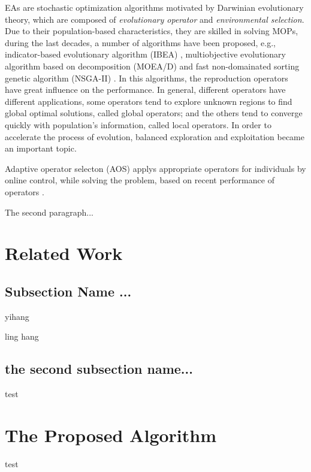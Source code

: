 \documentclass[journal]{IEEEtran}
\begin{document}
EAs are stochastic optimization algorithms motivated by Darwinian evolutionary theory, which are composed of \textit{evolutionary operator} and \textit{environmental selection}.
Due to their population-based characteristics, they are skilled in solving MOPs, during the last decades, a number of algorithms have been proposed, e.g., indicator-based evolutionary algorithm (IBEA) \cite{IBEA}, multiobjective evolutionary algorithm based on decomposition (MOEA/D) \cite{moead} and fast non-domainated sorting genetic algorithm (NSGA-II) \cite{nsga2}. In this algorithms, the reproduction operators have great influence on the performance.
In general, different operators have different applications, some operators tend to explore unknown regions to find global optimal solutions, called global operators; and the others tend to converge quickly with population's information, called local operators.
In order to accelerate the process of evolution, balanced exploration and exploitation became an important topic.

Adaptive operator selecton (AOS) applys appropriate operators for individuals by online control, while solving the problem, based on recent performance of operators \cite{li2011multi}.





\IEEEpubidadjcol

The second paragraph...
\section{Related Work}

\subsection{Subsection Name ... }
yihang

ling hang

\subsection{the second subsection name...}
test
\section{The Proposed Algorithm}
test
\end{document}
